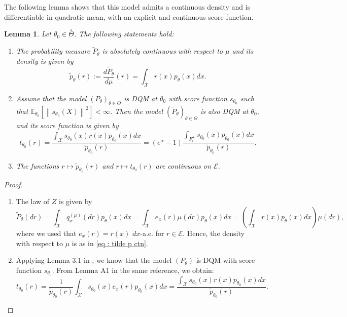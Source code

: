 \documentclass[a4paper, 11pt]{article}
\newtheorem{lem}{Lemma}
\theoremstyle{definition}
\newcommand{\norm}[1]{\left\|{#1}\right\|}
\newcommand{\E}{{\mathbb{E}}}
\newcommand{\cE}{{\mathcal{E}}}
\newcommand{\cX}{{\mathcal{X}}}
\begin{document}
{The following lemma shows that this model admits a continuous density and is differentiable in quadratic mean, with an explicit and continuous score function.
\begin{lem} \label{lem : expression tilde p et score ctn}
Let $\theta_0 \in \overset{\circ}{\Theta}$. The following statements hold:
\begin{enumerate}
	\item The probability measure $\widetilde{P}_{\theta}$ is absolutely continuous with respect to $\mu$ and its density is given by
	\begin{equation} \label{eq : tilde p ctn}
		\widetilde{p}_\theta(r) := \frac{d\widetilde{P}_{\theta}}{d\mu}(r)
		= \int_\cX r(x) p_\theta(x) dx.
	\end{equation}
	\item Assume that the model $(P_{\theta})_{\theta \in \Theta}$ is DQM at $\theta_0$ with score function $s_{\theta_0}$ such that $\E_{\theta_0}\left[\norm{s_{\theta_0}(X)}^2\right] < \infty$. Then the model $(\widetilde{P}_{\theta})_{\theta \in \Theta}$ is also DQM at $\theta_0$, and its score function is given by
	\begin{equation} \label{eq : score t ctn}
		t_{\theta_0}(r) = \frac{\int_\cX s_{\theta_0}(x) r(x)p_{\theta_0}(x) dx}{\widetilde{p}_{\theta_0}(r)} = (e^\alpha - 1) \frac{\int_{F_r^+} s_{\theta_0}(x) p_{\theta_0}(x) dx}{\widetilde{p}_{\theta_0}(r)}.
	\end{equation}
\item The functions $r \mapsto \widetilde{p}_{\theta_0}(r)$ and $r \mapsto t_{\theta_0}(r)$ are continuous on $\cE$.
\end{enumerate}
\end{lem}
\begin{proof}
\begin{enumerate}
	\item The law of $Z$ is given by
	\[
		\widetilde{P}_{\theta}(dr) = \int_\cX q^{(\mu)}_x(dr) p_\theta(x)dx = \int_\cX e_x(r) \mu(dr) p_\theta(x)dx = \left( \int_\cX r(x) p_\theta(x) dx \right) \mu(dr),
	\]
	where we used that $e_x(r) = r(x)$ $dx$-a.e. for $r \in \cE$. Hence, the density with respect to $\mu$ is as in \eqref{eq : tilde p ctn}.
	\item Applying Lemma 3.1 in \cite{steinbergerEfficiencyLocalDifferent}, we know that the model $(P_\theta)$ is DQM with score function $s_{\theta_0}$. From Lemma A1 in the same reference, we obtain:
	\[
		t_{\theta_0}(r) = \frac{1}{\widetilde{p}_{\theta_0}(r)} \int_\cX s_{\theta_0}(x) e_x(r) p_{\theta_0}(x) dx = \frac{\int_\cX s_{\theta_0}(x) r(x) p_{\theta_0}(x) dx}{\widetilde{p}_{\theta_0}(r)}.
\]
\end{enumerate}
\end{proof}}
\end{document}
